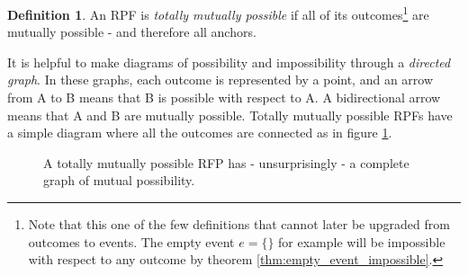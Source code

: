 \documentclass[twoside]{article}
\theoremstyle{plain}%
\theoremstyle{definition}
\newtheorem{definition}{Definition}[section]
\theoremstyle{remark}
\begin{document}
\begin{definition}
\label{def:totally_mutually_possible}
An RPF is \textit{totally mutually possible} if all of its outcomes\footnote{Note that this one of the few definitions that cannot later be upgraded from outcomes to events. The empty event \(e = \{\}\) for example will be impossible with respect to any outcome by theorem \ref{thm:empty_event_impossible}.} are mutually possible - and therefore all anchors.
\end{definition}

It is helpful to make diagrams of possibility and impossibility through a \textit{directed graph}. In these graphs, each outcome is represented by a point, and an arrow from A to B means that B is possible with respect to A. A bidirectional arrow means that A and B are mutually possible. Totally mutually possible RPFs have a simple diagram where all the outcomes are connected as in figure \ref{fig:mutually_possible_rpf}.

\begin{figure}[h]
\centering
{}
\caption{A totally mutually possible RFP has - unsurprisingly - a complete graph of mutual possibility.}
\label{fig:mutually_possible_rpf}
\end{figure}
\end{document}
